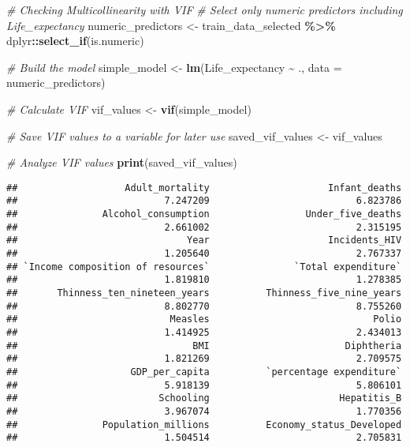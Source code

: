 \documentclass[
]{article}
\newenvironment{Shaded}{\begin{snugshade}}{\end{snugshade}}
\newcommand{\AttributeTok}[1]{\textcolor[rgb]{0.13,0.29,0.53}{#1}}
\newcommand{\CommentTok}[1]{\textcolor[rgb]{0.56,0.35,0.01}{\textit{#1}}}
\newcommand{\FunctionTok}[1]{\textcolor[rgb]{0.13,0.29,0.53}{\textbf{#1}}}
\newcommand{\NormalTok}[1]{#1}
\newcommand{\OtherTok}[1]{\textcolor[rgb]{0.56,0.35,0.01}{#1}}
\newcommand{\SpecialCharTok}[1]{\textcolor[rgb]{0.81,0.36,0.00}{\textbf{#1}}}
\begin{document}
\begin{Shaded}
\begin{Highlighting}[]
\CommentTok{\#  Checking Multicollinearity with VIF}
\CommentTok{\# Select only numeric predictors including Life\_expectancy}
\NormalTok{numeric\_predictors }\OtherTok{\textless{}{-}}\NormalTok{ train\_data\_selected }\SpecialCharTok{\%\textgreater{}\%}
\NormalTok{  dplyr}\SpecialCharTok{::}\FunctionTok{select\_if}\NormalTok{(is.numeric)}

\CommentTok{\# Build the model}
\NormalTok{simple\_model }\OtherTok{\textless{}{-}} \FunctionTok{lm}\NormalTok{(Life\_expectancy }\SpecialCharTok{\textasciitilde{}}\NormalTok{ ., }\AttributeTok{data =}\NormalTok{ numeric\_predictors)}

\CommentTok{\# Calculate VIF}
\NormalTok{vif\_values }\OtherTok{\textless{}{-}} \FunctionTok{vif}\NormalTok{(simple\_model)}

\CommentTok{\# Save VIF values to a variable for later use}
\NormalTok{saved\_vif\_values }\OtherTok{\textless{}{-}}\NormalTok{ vif\_values}

\CommentTok{\# Analyze VIF values}
\FunctionTok{print}\NormalTok{(saved\_vif\_values)}
\end{Highlighting}
\end{Shaded}

\begin{verbatim}
##                   Adult_mortality                     Infant_deaths 
##                          7.247209                          6.823786 
##               Alcohol_consumption                 Under_five_deaths 
##                          2.661002                          2.315195 
##                              Year                     Incidents_HIV 
##                          1.205640                          2.767337 
## `Income composition of resources`               `Total expenditure` 
##                          1.819810                          1.278385 
##       Thinness_ten_nineteen_years          Thinness_five_nine_years 
##                          8.802770                          8.755260 
##                           Measles                             Polio 
##                          1.414925                          2.434013 
##                               BMI                        Diphtheria 
##                          1.821269                          2.709575 
##                    GDP_per_capita          `percentage expenditure` 
##                          5.918139                          5.806101 
##                         Schooling                       Hepatitis_B 
##                          3.967074                          1.770356 
##               Population_millions          Economy_status_Developed 
##                          1.504514                          2.705831
\end{verbatim}
\end{document}
